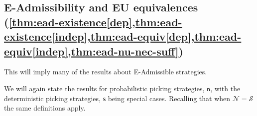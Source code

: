 \documentclass[a4paper]{article}
\renewcommand\S{\mathcal{S}}
\newcommand\s{\mathsf{s}}
\newcommand{\n}{\mathsf{n}}
\renewcommand{\nu}{\n}
\newcommand\Nu{\mathcal{N}}
\renewcommand{\color}[1]{}
\newenvironment{colored}[1]{\leavevmode\color{#1}}{}
\newenvironment{CCM rewritten}
{\begingroup\color{blue}} %
{\endgroup}              %
\begin{document}
\begin{colored}{violet}
\subsection{E-Admissibility and EU equivalences\\  (\cref{thm:ead-existence[dep],thm:ead-existence[indep],thm:ead-equiv[dep],thm:ead-equiv[indep],thm:ead-nu-nec-suff})}
This will imply many of the results about E-Admissible strategies.

We will again state the results for probabilistic picking strategies, $\nu$, with the deterministic picking strategies, $\s$ being special cases. Recalling that when $\Nu=\S$ the same definitions apply.
 

\end{colored}
\end{document}
